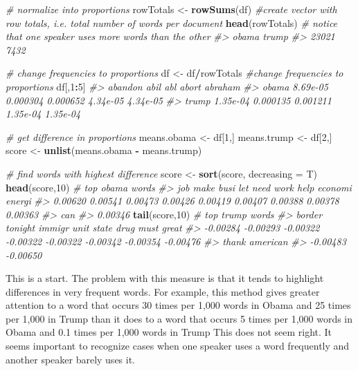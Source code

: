\documentclass[]{book}
\newenvironment{Shaded}{\begin{snugshade}}{\end{snugshade}}
\newcommand{\CommentTok}[1]{\textcolor[rgb]{0.56,0.35,0.01}{\textit{#1}}}
\newcommand{\DataTypeTok}[1]{\textcolor[rgb]{0.13,0.29,0.53}{#1}}
\newcommand{\DecValTok}[1]{\textcolor[rgb]{0.00,0.00,0.81}{#1}}
\newcommand{\KeywordTok}[1]{\textcolor[rgb]{0.13,0.29,0.53}{\textbf{#1}}}
\newcommand{\NormalTok}[1]{#1}
\newcommand{\OperatorTok}[1]{\textcolor[rgb]{0.81,0.36,0.00}{\textbf{#1}}}
\newcommand{\StringTok}[1]{\textcolor[rgb]{0.31,0.60,0.02}{#1}}
\begin{document}
\begin{Shaded}
\begin{Highlighting}[]
\CommentTok{# normalize into proportions}
\NormalTok{rowTotals <-}\StringTok{ }\KeywordTok{rowSums}\NormalTok{(df) }\CommentTok{#create vector with row totals, i.e. total number of words per document}
\KeywordTok{head}\NormalTok{(rowTotals) }\CommentTok{# notice that one speaker uses more words than the other}
\CommentTok{#> obama trump }
\CommentTok{#> 23021  7432}

\CommentTok{# change frequencies to proportions}
\NormalTok{df <-}\StringTok{ }\NormalTok{df}\OperatorTok{/}\NormalTok{rowTotals }\CommentTok{#change frequencies to proportions}
\NormalTok{df[,}\DecValTok{1}\OperatorTok{:}\DecValTok{5}\NormalTok{]}
\CommentTok{#>        abandon     abil      abl    abort  abraham}
\CommentTok{#> obama 8.69e-05 0.000304 0.000652 4.34e-05 4.34e-05}
\CommentTok{#> trump 1.35e-04 0.000135 0.001211 1.35e-04 1.35e-04}

\CommentTok{# get difference in proportions}
\NormalTok{means.obama <-}\StringTok{ }\NormalTok{df[}\DecValTok{1}\NormalTok{,]}
\NormalTok{means.trump <-}\StringTok{ }\NormalTok{df[}\DecValTok{2}\NormalTok{,]}
\NormalTok{score <-}\StringTok{ }\KeywordTok{unlist}\NormalTok{(means.obama }\OperatorTok{-}\StringTok{ }\NormalTok{means.trump)}

\CommentTok{# find words with highest difference}
\NormalTok{score <-}\StringTok{ }\KeywordTok{sort}\NormalTok{(score, }\DataTypeTok{decreasing =}\NormalTok{ T)}
\KeywordTok{head}\NormalTok{(score,}\DecValTok{10}\NormalTok{) }\CommentTok{# top obama words}
\CommentTok{#>     job    make    busi     let    need    work    help economi  energi }
\CommentTok{#> 0.00620 0.00541 0.00473 0.00426 0.00419 0.00407 0.00388 0.00378 0.00363 }
\CommentTok{#>     can }
\CommentTok{#> 0.00346}
\KeywordTok{tail}\NormalTok{(score,}\DecValTok{10}\NormalTok{) }\CommentTok{# top trump words}
\CommentTok{#>   border  tonight   immigr     unit    state     drug     must    great }
\CommentTok{#> -0.00284 -0.00293 -0.00322 -0.00322 -0.00322 -0.00342 -0.00354 -0.00476 }
\CommentTok{#>    thank american }
\CommentTok{#> -0.00483 -0.00650}
\end{Highlighting}
\end{Shaded}

This is a start. The problem with this measure is that it tends to highlight differences in very frequent words. For example, this method gives greater attention to a word that occurs 30 times per 1,000 words in Obama and 25 times per 1,000 in Trump than it does to a word that occurs 5 times per 1,000 words in Obama and 0.1 times per 1,000 words in Trump This does not seem right. It seems important to recognize cases when one speaker uses a word frequently and another speaker barely uses it.
\end{document}

